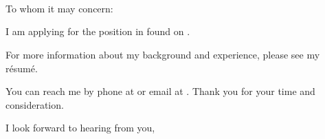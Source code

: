 \begin{letter}{
    \vCompanyName{}\\
    \vCompanyAddress{}
}
    \begin{center}
        \vMyName{}\\
        \vMyAddress{}\\
        \vMyPhone{}
    \end{center}

    \signature{\vMySignature{}}

    \opening{To whom it may concern:}

    I am applying for the \vJobPosition{} position in \vJobDepartment{} found on \vJobFound{}.

    

    For more information about my background and experience, please see my r\'esum\'e.

    You can reach me by phone at \vMyPhone{} or email at \vMyEmail{}.  Thank you for your time and consideration.

    \addtolength{\medskipamount}{-.95\medskipamount}
    \closing{I look forward to hearing from you,}
    \addtolength{\medskipamount}{19\medskipamount}
\end{letter}
